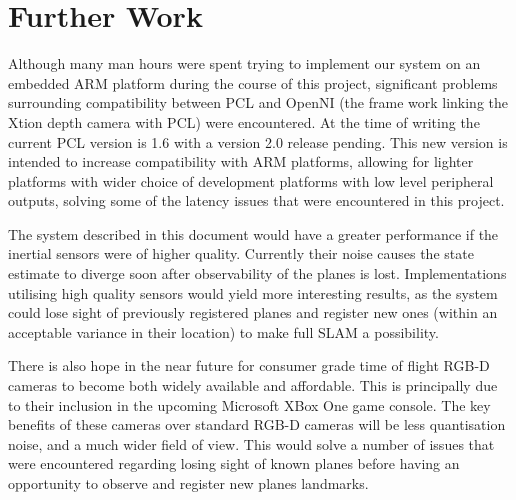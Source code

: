 \documentclass[]{article}
\begin{document}
{\section{Further Work}
Although many man hours were spent trying to implement our system on an embedded ARM platform during the course of this project, significant problems surrounding compatibility between PCL and OpenNI (the frame work linking the Xtion depth camera with PCL) were encountered. At the time of writing the current PCL version is 1.6 with a version 2.0 release pending. This new version is intended to increase compatibility with ARM platforms, allowing for lighter platforms with wider choice of development platforms with low level peripheral outputs, solving some of the latency issues that were encountered in this project. 

The system described in this document would have a greater performance if the inertial sensors were of higher quality. Currently their noise causes the state estimate to diverge soon after observability of the planes is lost. Implementations utilising high quality sensors would yield more interesting results, as the system could lose sight of previously registered planes and register new ones (within an acceptable variance in their location) to make full SLAM a possibility. 

There is also hope in the near future for consumer grade time of flight RGB-D cameras to become both widely available and affordable. This is principally due to their inclusion in the upcoming Microsoft XBox One game console. The key benefits of these cameras over standard RGB-D cameras will be less quantisation noise, and a much wider field of view. This would solve a number of issues that were encountered regarding losing sight of known planes before having an opportunity to observe and register new planes landmarks. 


\clearpage

\nocite{*}

\printbibliography
% 



}
\end{document}
